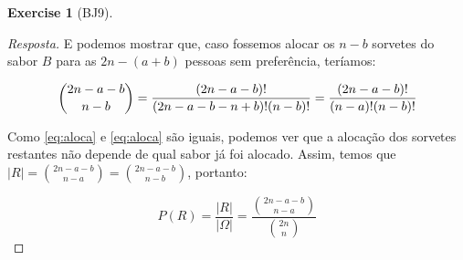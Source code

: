 \documentclass[
]{article}
\theoremstyle{definition}
\theoremstyle{definition}
\theoremstyle{definition}
\newtheorem{exercise}{Exercise}[section]
\theoremstyle{definition}
\theoremstyle{remark}
\begin{document}
\begin{exercise}[BJ9]
\begin{proof}[Resposta]
E podemos mostrar que, caso fossemos alocar os \(n-b\) sorvetes do sabor \(B\) para as \(2n-(a+b)\) pessoas sem preferência, teríamos:

\begin{equation}
\binom{2n-a-b}{n-b} = \frac{(2n-a-b)!}{(2n-a-b-n+b)!(n-b)!} = \frac{(2n-a-b)!}{(n-a)!(n-b)!}\\
\label{eq:alocb}
\end{equation}

Como \eqref{eq:aloca} e \eqref{eq:aloca} são iguais, podemos ver que a alocação dos sorvetes restantes não depende de qual sabor já foi alocado. Assim, temos que \(|R| = \binom{2n-a-b}{n-a} = \binom{2n-a-b}{n-b}\), portanto:

\begin{equation*}
P(R) = \frac{|R|}{|\Omega|} = \frac{\binom{2n-a-b}{n-a}}{\binom{2n}{n}}
\end{equation*}
\end{proof}

\end{exercise}
\end{document}
